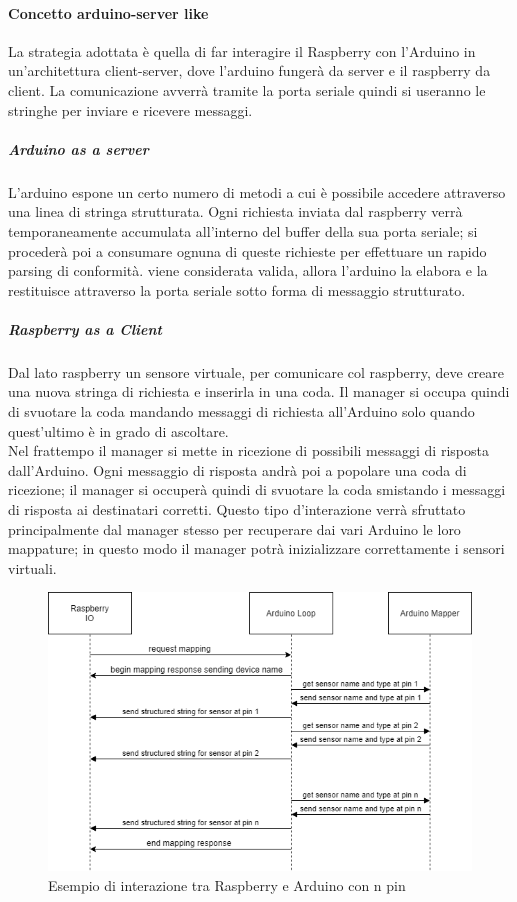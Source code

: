 \documentclass[12pt]{article}
\begin{document}
\paragraph{Concetto arduino-server like}
La strategia adottata è quella di far interagire il Raspberry con l'Arduino in un'architettura client-server, dove l'arduino fungerà da server e il raspberry da client. La comunicazione avverrà tramite la porta seriale quindi si useranno le stringhe per inviare e ricevere messaggi.  

\subparagraph{Arduino as a server}
L'arduino espone un certo numero di metodi a cui è possibile accedere attraverso una linea di stringa strutturata. Ogni richiesta inviata dal raspberry verrà temporaneamente accumulata all'interno del buffer della sua porta seriale; si procederà poi a consumare ognuna di queste richieste per effettuare un rapido parsing di conformità. viene considerata valida, allora l'arduino la elabora e la restituisce attraverso la porta seriale sotto forma di messaggio strutturato.
\subparagraph{Raspberry as a Client}
Dal lato raspberry un sensore virtuale, per comunicare col raspberry, deve creare una nuova stringa di richiesta e inserirla in una coda. 
Il manager si occupa quindi di svuotare la coda mandando messaggi di richiesta all'Arduino solo quando quest'ultimo è in grado di ascoltare.\\ Nel frattempo il manager si mette in ricezione di possibili messaggi di risposta dall'Arduino. Ogni messaggio di risposta andrà poi a popolare una coda di ricezione; il manager si occuperà quindi di svuotare la coda smistando i messaggi di risposta ai destinatari corretti.
Questo tipo d'interazione verrà sfruttato principalmente dal manager stesso per recuperare dai vari Arduino le loro mappature; in questo modo il manager potrà inizializzare correttamente i sensori virtuali.
\begin{figure}[h!]
\centering
	\includegraphics[scale=0.75]{img/parteLocale/RaspArduInterationDiagram.png}  
    \caption{Esempio di interazione tra Raspberry e Arduino con n pin}
\end{figure}
\phantom{dsadas}
\newpage
\phantom{dsadas}
\newpage
\end{document}
